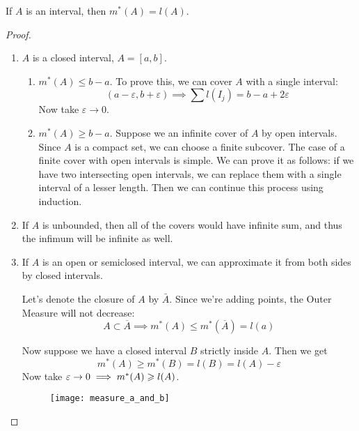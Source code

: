 \begin{proposition}
    If $A$ is an interval, then $m^*(A) = l(A)$.
\end{proposition}
\begin{proof}
    \begin{enumerate}[label=\alph*)]
        \item {
            $A$ is a closed interval, $A = [a, b]$.
            \begin{enumerate}[label=\arabic*.]
                \item {
                    $m^*(A) \le b - a$.
                    To prove this, we can cover $A$ with a single interval:
                    \[ (a - \varepsilon, b + \varepsilon) \implies \sum l(I_j) = b - a + 2\varepsilon \]
                    Now take $\varepsilon \to 0$.
                }
                \item {
                    $m^*(A) \ge b - a$.
                    Suppose we an infinite cover of $A$ by open intervals.
                    Since $A$ is a compact set, we can choose a finite subcover.
                    The case of a finite cover with open intervals is simple.
                    We can prove it as follows: if we have two intersecting 
                    open intervals, we can replace them with a single interval
                    of a lesser length. Then we can continue this process using induction.
                }
            \end{enumerate}
        }
        \item {
            If $A$ is unbounded, then all of the covers would have infinite sum, and thus 
            the infimum will be infinite as well.
        }
        \item {
            If $A$ is an open or semiclosed interval, we can approximate it from both sides
            by closed intervals.

            Let's denote the closure of $A$ by $\bar{A}$.
            Since we're adding points, the Outer Measure will not decrease:
            \[ A \subset \overline{A} \implies m^*(A) \le m^*(\overline{A}) = l(a) \]

            \pagebreak
            Now suppose we have a closed interval $B$ strictly inside $A$. Then we get
            \[ m^*(A) \ge m^*(B) = l(B) = l(A) - \varepsilon \]
            Now take $\varepsilon \to 0 \implies m^*(A) \geqslant l(A)$.

            \begin{figure*}[h]
                \centering
                \texttt{[image: measure\_a\_and\_b]}
            \end{figure*}
        }
    \end{enumerate}
\end{proof}